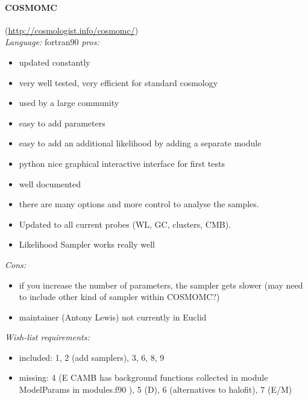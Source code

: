 \paragraph{COSMOMC}(\url{http://cosmologist.info/cosmomc/})\\
{\it Language:} fortran90
{\it pros:}
\begin{itemize}
 \item updated constantly
 \item very well tested, very efficient for standard cosmology
 \item used by a large community
 \item easy to add parameters
 \item easy to add an additional likelihood by adding a separate module
 \item python nice graphical interactive interface for first tests
 \item well documented
 \item there are many options and more control to analyse the samples. 
 \item Updated to all current probes (WL, GC, clusters, CMB).
 \item Likelihood Sampler works really well
\end{itemize}
{\it Cons: }
\begin{itemize}
 \item if you increase the number of parameters, the sampler gets slower (may need to include other kind of sampler within COSMOMC?)
 \item maintainer (Antony Lewis) not currently in Euclid
\end{itemize}
{\it Wish-list requirements: }
\begin{itemize}
 \item included: 1, 2 (add samplers), 3, 6, 8, 9
 \item missing: 4 (E CAMB has background functions collected in module ModelParams in modules.f90 ), 5 (D), 6 (alternatives to halofit), 7 (E/M) 
\end{itemize}

